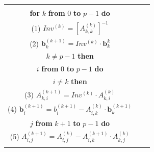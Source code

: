\documentclass[graybox]{svmult}
\begin{document}
\begin{figure}[t]
\begin{center}
\begin{tabular}[t]{|ccc|}\hline
\hspace*{3mm}&
\begin{minipage}[c]{0.5\hsize}
~\\
{\bf for} $k$ {\bf from} $0$ {\bf to} $p-1$ {\bf do}\\
\hspace*{1.2em}(1) $Inv^{(k)} = [A_{k,k}^{(k)}]^{-1}$\\
\hspace*{1.2em}(2) $\bm{b}_k^{(k+1)}=Inv^{(k)}\cdot \bm{b}_k^{k}$\\
\hspace*{1.2em}{\bf if} $k \neq p-1$ {\bf then}\\
\hspace*{1.2em}\hspace*{1.2em}{\bf for} $i$ {\bf from} $0$ {\bf to} $p-1$ {\bf do}\\
\hspace*{1.2em}\hspace*{1.2em}\hspace*{1.2em}{\bf if} $i \neq k$ {\bf then}\\
\hspace*{1.2em}\hspace*{1.2em}\hspace*{1.2em}\hspace*{1.2em}(3) $A_{k,i}^{(k+1)}=Inv^{(k)}\cdot A_{k,i}^{(k)}$\\
\hspace*{1.2em}\hspace*{1.2em}\hspace*{1.2em}\hspace*{1.2em}(4) $\bm{b}_i^{(k+1)}=b_i^{(k+1)}-A_{i,k}^{(k)}\cdot \bm{b}_k^{(k+1)}$\\
\hspace*{1.2em}\hspace*{1.2em}\hspace*{1.2em}\hspace*{1.2em}{\bf for} $j$ {\bf from} $k+1$ {\bf to} $p-1$ {\bf do}\\
\hspace*{1.2em}\hspace*{1.2em}\hspace*{1.2em}\hspace*{1.2em}\hspace*{1.2em}(5) $A_{i,j}^{(k+1)} = A_{i,j}^{(k)}-A_{i,k}^{(k+1)}\cdot A_{k,j}^{(k)}$\\

\end{minipage}
\end{tabular}
\end{center}
\end{figure}
\end{document}
